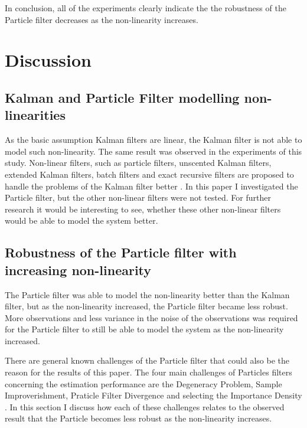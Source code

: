 \documentclass[conference]{IEEEtran}
\begin{document}
In conclusion, all of the experiments clearly indicate the the robustness of the Particle filter decreases as the non-linearity increases.


\section{Discussion}\label{sec:discussion}

\subsection{Kalman and Particle Filter modelling non-linearities}

As the basic assumption Kalman filters are linear, the Kalman filter is not able to model such non-linearity.
The same result was observed in the experiments of this study.
Non-linear filters, such as particle filters, unscented Kalman filters, extended Kalman filters, batch filters and exact recursive filters are proposed to handle the problems of the Kalman filter better \cite{b5}.
In this paper I investigated the Particle filter, but the other non-linear filters were not tested. 
For further research it would be interesting to see, whether these other non-linear filters would be able to model the system better.

\subsection{Robustness of the Particle filter with increasing non-linearity}

The Particle filter was able to model the non-linearity better than the Kalman filter, but as the non-linearity increased, the Particle filter became less robust.  
More observations and less variance in the noise of the observations was required for the Particle filter to still be able to model the system as the non-linearity increased.

There are general known challenges of the Particle filter that could also be the reason for the results of this paper.
The four main challenges of Particles filters concerning the estimation performance are the Degeneracy Problem, Sample Improverishment, Praticle Filter Divergence and selecting the Importance Density \cite{b4}.
In this section I discuss how each of these challenges relates to the observed result that the Particle becomes less robust as the non-linearity increases. 
\end{document}
